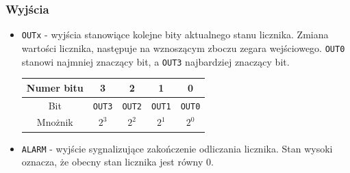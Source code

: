 \documentclass[a4paper]{article}
\begin{document}
\subsubsection{Wyjścia}
\begin{itemize}
    \item \verb|OUTx| - wyjścia stanowiące kolejne bity aktualnego stanu licznika. Zmiana wartości licznika, następuje
            na wznoszącym zboczu zegara wejściowego. \verb|OUT0| stanowi najmniej znaczący bit, a \verb|OUT3| najbardziej
            znaczący bit.
            \begin{center}
                \begin{tabular}{|c|c|c|c|c|}
                  \hline Numer bitu & 3 & 2 & 1 & 0 \\ 
                  \hline Bit & \verb|OUT3| & \verb|OUT2| & \verb|OUT1| & \verb|OUT0| \\
                  \hline Mnożnik & $2^3$ & $2^2$ & $2^1$ & $2^0$  \\
                  \hline
                \end{tabular}
              \end{center}
              
    \item \verb|ALARM| - wyjście sygnalizujące zakończenie odliczania licznika. Stan wysoki oznacza, że obecny stan licznika
              jest równy 0.

\end{itemize}

\pagebreak
\end{document}
